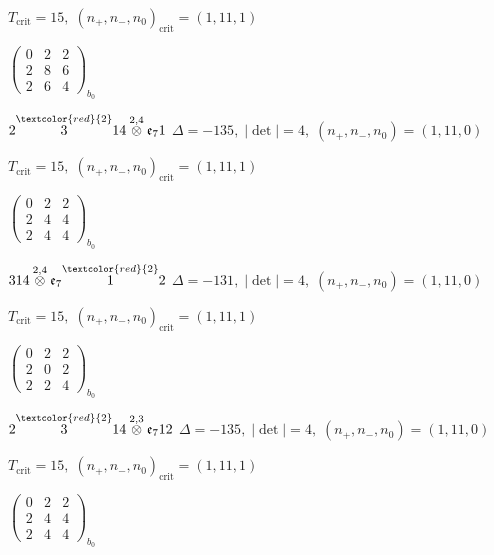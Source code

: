 \documentclass[10pt]{article}
\begin{document}
\hspace{1em}$T_{\text{crit}}=15,\; (n_+,n_-,n_0)_{\text{crit}}=(1,11,1)$

\hspace{2em}$\left(\begin{smallmatrix}0 & 2 & 2 \\ 2 & 8 & 6 \\ 2 & 6 & 4\end{smallmatrix}\right)_{\!b_0}$

\smallskip

$2\overset{\textcolor{red}{2}}{3}14\overset{2,4}{\otimes}\mathfrak{e}_71$ \quad $\Delta=-135,\; |\det|=4,\; (n_+,n_-,n_0)=(1,11,0)$

\hspace{1em}$T_{\text{crit}}=15,\; (n_+,n_-,n_0)_{\text{crit}}=(1,11,1)$

\hspace{2em}$\left(\begin{smallmatrix}0 & 2 & 2 \\ 2 & 4 & 4 \\ 2 & 4 & 4\end{smallmatrix}\right)_{\!b_0}$

\smallskip

$314\overset{2,4}{\otimes}\mathfrak{e}_7\overset{\textcolor{red}{2}}{1}2$ \quad $\Delta=-131,\; |\det|=4,\; (n_+,n_-,n_0)=(1,11,0)$

\hspace{1em}$T_{\text{crit}}=15,\; (n_+,n_-,n_0)_{\text{crit}}=(1,11,1)$

\hspace{2em}$\left(\begin{smallmatrix}0 & 2 & 2 \\ 2 & 0 & 2 \\ 2 & 2 & 4\end{smallmatrix}\right)_{\!b_0}$

\smallskip

$2\overset{\textcolor{red}{2}}{3}14\overset{2,3}{\otimes}\mathfrak{e}_712$ \quad $\Delta=-135,\; |\det|=4,\; (n_+,n_-,n_0)=(1,11,0)$

\hspace{1em}$T_{\text{crit}}=15,\; (n_+,n_-,n_0)_{\text{crit}}=(1,11,1)$

\hspace{2em}$\left(\begin{smallmatrix}0 & 2 & 2 \\ 2 & 4 & 4 \\ 2 & 4 & 4\end{smallmatrix}\right)_{\!b_0}$
\end{document}
